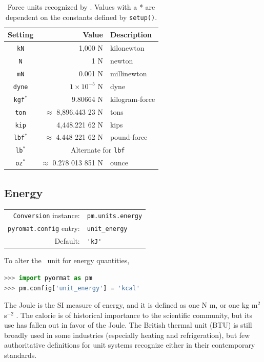 \begin{table}
\centering
\caption{Force units recognized by \PM.  Values with a * are dependent on the constants defined by \texttt{setup()}.}\label{tab:force}
\begin{tabular}{crl}
\hline
Setting & Value & Description\\
\hline
\verb|kN| & 1,000 N & kilonewton\\
\verb|N| & 1 N & newton\\
\verb|mN| & 0.001 N & millinewton\\
\verb|dyne| & $1\times 10^{-5}$ N & dyne\\
\verb|kgf|$^*$ & 9.80664 N & kilogram-force\\
\verb|ton| & $\approx$ 8,896.443 23 N & tons\\
\verb|kip| & 4,448.221 62 N & kips\\
\verb|lbf|$^*$ & $\approx$ 4.448 221 62 N & pound-force\\
\verb|lb|$^*$ & \multicolumn{2}{c}{Alternate for \texttt{lbf}}\\
\verb|oz|$^*$ & $\approx$ 0.278 013 851 N & ounce\\
\hline
\end{tabular}
\end{table}

%
%

\subsection{Energy}\label{sec:units:energy}

\begin{tabular}{rl}
\hline
\verb|Conversion| instance: & \verb|pm.units.energy|\\
\verb|pyromat.config| entry: & \verb|unit_energy|\\
Default: & \verb|'kJ'|\\
\hline
\end{tabular}
\vspace{1em}

To alter the \PM\ unit for energy quantities,
\begin{lstlisting}[language=Python]
>>> import pyormat as pm
>>> pm.config['unit_energy'] = 'kcal'
\end{lstlisting}

The Joule is the SI measure of energy, and it is defined as one N m, or one kg m$^2$ s$^{-2}$ \cite[p.137]{si:2019}.  The calorie is of historical importance to the scientific community, but its use has fallen out in favor of the Joule.  The British thermal unit (BTU) is still broadly used in some industries (especially heating and refrigeration), but few authoritative definitions for unit systems recognize either in their contemporary standards.

